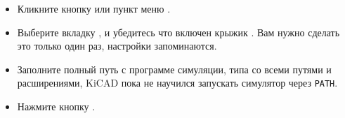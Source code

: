\begin{enumerate}
\begin{itemize}
  \item
Кликните кнопку или пункт меню .
  \item
Выберите вкладку , и убедитесь что включен крыжик . Вам нужно сделать это только один раз, настройки
запоминаются.
  \item
Заполните полный путь с программе симуляции, типа
 со всеми путями и расширениями, KiCAD пока не
научился запускать симулятор через \verb|PATH|.
  \item
Нажмите кнопку .
\end{itemize}
\end{enumerate}

\secup
